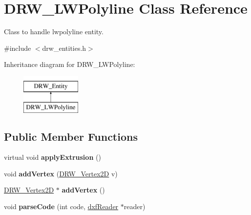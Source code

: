 \hypertarget{classDRW__LWPolyline}{\section{D\-R\-W\-\_\-\-L\-W\-Polyline Class Reference}
\label{classDRW__LWPolyline}
}


Class to handle lwpolyline entity.  




{\ttfamily \#include $<$drw\-\_\-entities.\-h$>$}

Inheritance diagram for D\-R\-W\-\_\-\-L\-W\-Polyline\-:\begin{figure}[H]
\begin{center}
\leavevmode
\includegraphics[height=2.000000cm]{classDRW__LWPolyline}
\end{center}
\end{figure}
\subsection*{Public Member Functions}
\begin{DoxyCompactItemize}
\item 
\hypertarget{classDRW__LWPolyline_a19b9554fccc115de6d4a0ee4d556b6f2}{virtual void {\bfseries apply\-Extrusion} ()}\label{classDRW__LWPolyline_a19b9554fccc115de6d4a0ee4d556b6f2}

\item 
\hypertarget{classDRW__LWPolyline_a80c04abc7c6b5a1fecc5bd790e20fcde}{void {\bfseries add\-Vertex} (\hyperlink{classDRW__Vertex2D}{D\-R\-W\-\_\-\-Vertex2\-D} v)}\label{classDRW__LWPolyline_a80c04abc7c6b5a1fecc5bd790e20fcde}

\item 
\hypertarget{classDRW__LWPolyline_a472ab6e5ba8919a138937c293092c818}{\hyperlink{classDRW__Vertex2D}{D\-R\-W\-\_\-\-Vertex2\-D} $\ast$ {\bfseries add\-Vertex} ()}\label{classDRW__LWPolyline_a472ab6e5ba8919a138937c293092c818}

\item 
\hypertarget{classDRW__LWPolyline_a05ab17440df5865cf574aeee432c27cd}{void {\bfseries parse\-Code} (int code, \hyperlink{classdxfReader}{dxf\-Reader} $\ast$reader)}\label{classDRW__LWPolyline_a05ab17440df5865cf574aeee432c27cd}

\end{DoxyCompactItemize}
